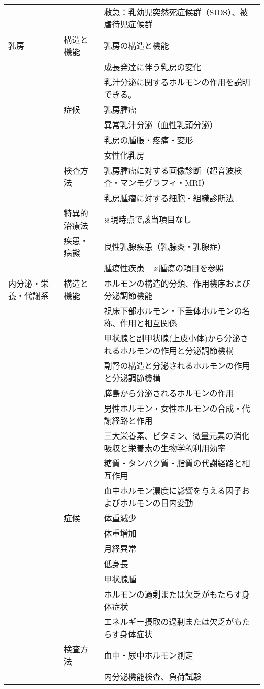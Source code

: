 \begin{xltabular}{\linewidth}{XXX}
 &  & 救急：乳幼児突然死症候群（SIDS）、被虐待児症候群 \\
乳房 & 構造と機能 & 乳房の構造と機能 \\
 &  & 成長発達に伴う乳房の変化 \\
 &  & 乳汁分泌に関するホルモンの作用を説明できる。 \\
 & 症候 & 乳房腫瘤 \\
 &  & 異常乳汁分泌（血性乳頭分泌） \\
 &  & 乳房の腫脹・疼痛・変形 \\
 &  & 女性化乳房 \\
 & 検査方法 & 乳房腫瘤に対する画像診断（超音波検査・マンモグラフィ・MRI） \\
 &  & 乳房腫瘤に対する細胞・組織診断法 \\
 & 特異的治療法 & ※現時点で該当項目なし \\
 & 疾患・病態 & 良性乳腺疾患（乳腺炎・乳腺症） \\
 &  & 腫瘍性疾患　※腫瘍の項目を参照 \\
内分泌・栄養・代謝系 & 構造と機能 & ホルモンの構造的分類、作用機序および分泌調節機能 \\
 &  & 視床下部ホルモン・下垂体ホルモンの名称、作用と相互関係 \\
 &  & 甲状腺と副甲状腺(上皮小体)から分泌されるホルモンの作用と分泌調節機構 \\
 &  & 副腎の構造と分泌されるホルモンの作用と分泌調節機構 \\
 &  & 膵島から分泌されるホルモンの作用 \\
 &  & 男性ホルモン・女性ホルモンの合成・代謝経路と作用 \\
 &  & 三大栄養素、ビタミン、微量元素の消化吸収と栄養素の生物学的利用効率 \\
 &  & 糖質・タンパク質・脂質の代謝経路と相互作用 \\
 &  & 血中ホルモン濃度に影響を与える因子およびホルモンの日内変動 \\
 & 症候 & 体重減少 \\
 &  & 体重増加 \\
 &  & 月経異常 \\
 &  & 低身長 \\
 &  & 甲状腺腫 \\
 &  & ホルモンの過剰または欠乏がもたらす身体症状 \\
 &  & エネルギー摂取の過剰または欠乏がもたらす身体症状 \\
 & 検査方法 & 血中・尿中ホルモン測定 \\
 &  & 内分泌機能検査、負荷試験 \\

\end{xltabular}
